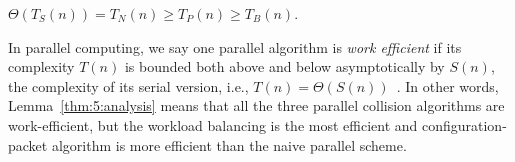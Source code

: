 \begin{lemma}
\label{thm:5:analysis}
$\Theta(T_S(n)) = T_N(n) \geq T_P(n) \geq T_B(n)$.
\end{lemma}

\begin{remark} In parallel computing, we say one parallel algorithm is \emph{work efficient} if its complexity $T(n)$ is bounded both above and below asymptotically by $S(n)$, the complexity of its serial version, i.e., $T(n) = \Theta(S(n))$~\cite{Joesphbook}. In other words, Lemma~\ref{thm:5:analysis} means that all the three parallel collision algorithms are work-efficient, but the workload balancing is the most efficient and configuration-packet algorithm is more efficient than the naive parallel scheme.
\end{remark}

